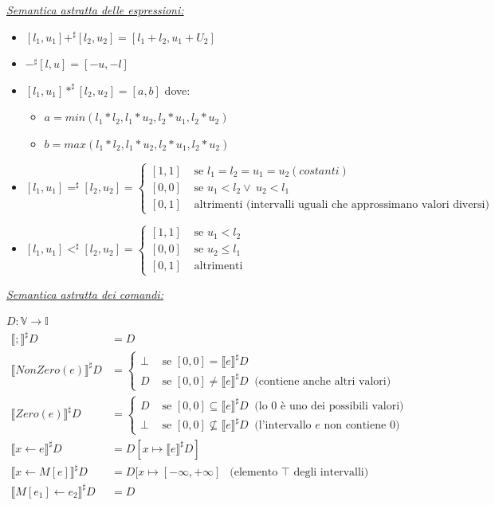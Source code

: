 \documentclass[a4paper, 11pt]{report}
\begin{document}
\noindent
\textit{\underline{Semantica astratta delle espressioni:}}
\begin{itemize}
	\item $[l_1, u_1] +^\sharp [l_2, u_2] = [l_1 + l_2, u_1 + U_2]$
	\item $-^\sharp[l, u] = [-u, -l]$
	\item $[l_1, u_1] *^\sharp [l_2, u_2] = [a, b]$ dove:
	\begin{itemize}
		\item $a=min(l_1*l_2, l_1*u_2, l_2*u_1, l_2*u_2)$
		\item $b=max(l_1*l_2, l_1*u_2, l_2*u_1, l_2*u_2)$
	\end{itemize}
	\item $[l_1, u_1] =^\sharp [l_2, u_2] =
	\begin{cases}
	[1, 1] &\text{ se } l_1=l_2=u_1=u_2 (costanti) \\
	[0, 0] &\text{ se } u_1 < l_2 \lor ~u_2 < l_1\\
	[0, 1] &\text{ altrimenti (intervalli uguali che approssimano valori diversi) }
	\end{cases}$
	\item $[l_1, u_1] <^\sharp [l_2, u_2] =
	\begin{cases}
	[1, 1] &\text{ se } u_1<l_2 \\
	[0, 0] &\text{ se } u_2 \leq l_1 \\
	[0, 1] &\text{ altrimenti }
	\end{cases}$
\end{itemize}

\underline{\textit{Semantica astratta dei comandi:}}

$D : \mathbb{V} \rightarrow \mathbb{I}$
\begin{align*}
\llbracket ; \rrbracket^\sharp D &= D\\
\llbracket NonZero(e) \rrbracket^\sharp D &=
\begin{cases}
\bot &\text{ se } [0, 0] = \llbracket e \rrbracket^\sharp D \\
D &\text{ se } [0, 0] \neq \llbracket e \rrbracket^\sharp D~ \text{ (contiene anche altri valori)}
\end{cases}\\
\llbracket Zero(e) \rrbracket^\sharp D &=
\begin{cases}
D &\text{ se } [0, 0] \subseteq \llbracket e \rrbracket^\sharp D~ \text{ (lo $0$ è uno dei possibili valori)} \\
\bot &\text{ se } [0, 0] \nsubseteq \llbracket e \rrbracket^\sharp D~ \text{ (l'intervallo $e$ non contiene $0$)}
\end{cases}\\
\llbracket x\leftarrow e \rrbracket^\sharp D &= D[x\mapsto \llbracket e\rrbracket^\sharp D]\\
\llbracket x\leftarrow M[e] \rrbracket^\sharp D &= D[x\mapsto [-\infty, +\infty]~~ \text{ (elemento $\top$ degli intervalli)}\\
\llbracket M[e_1]\leftarrow e_2 \rrbracket^\sharp D &= D
\end{align*}
\end{document}

